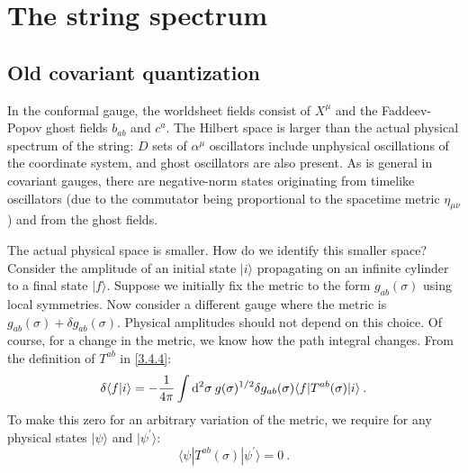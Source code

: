 
\chapter{\texorpdfstring{The string spectrum}{4 The string spectrum}} \label{cha:4}

\section{\texorpdfstring{Old covariant quantization}{Old covariant quantization}} \label{sec:4.1}

In the conformal gauge, the worldsheet fields consist of $X^{\mu}$ and the Faddeev-Popov ghost fields $b_{a b}$ and $c^{a}$. The Hilbert space is larger than the actual physical spectrum of the string: $D$ sets of $\alpha^{\mu}$ oscillators include unphysical oscillations of the coordinate system, and ghost oscillators are also present.
As is general in covariant gauges, there are negative-norm states originating from timelike oscillators (due to the commutator being proportional to the spacetime metric $\eta_{\mu \nu}$) and from the ghost fields.

The actual physical space is smaller. How do we identify this smaller space? Consider the amplitude of an initial state $\lvert i\rangle$ propagating on an infinite cylinder to a final state $\lvert f\rangle$. Suppose we initially fix the metric to the form $g_{a b}(\sigma)$ using local symmetries.
Now consider a different gauge where the metric is $g_{a b}(\sigma)+\delta g_{a b}(\sigma)$. Physical amplitudes should not depend on this choice.
Of course, for a change in the metric, we know how the path integral changes. From the definition of $T^{a b}$ in \eqref{3.4.4}:
\begin{equation}
	\delta\langle f | i\rangle=-\frac{1}{4 \pi} \int \mathrm{d}^{2} \sigma\: g(\sigma)^{1 / 2} \delta g_{a b}(\sigma) \langle f |T^{a b}(\sigma)| i\rangle \:. \label{4.1.1}
\end{equation}
To make this zero for an arbitrary variation of the metric, we require for any physical states $|\psi\rangle$ and $\lvert\psi^{\prime}\rangle$:
\begin{equation}\label{4.1.2}
	\langle\psi|T^{a b}(\sigma)| \psi^{\prime}\rangle=0 \:.
\end{equation}


